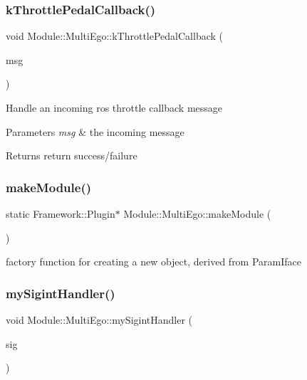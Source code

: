 \subsubsection{\texorpdfstring{k\+Throttle\+Pedal\+Callback()}{kThrottlePedalCallback()}}
{\footnotesize\ttfamily void Module\+::\+Multi\+Ego\+::k\+Throttle\+Pedal\+Callback (\begin{DoxyParamCaption}\item[{const std\+\_\+msgs\+::\+Float32\+::\+Const\+Ptr \&}]{msg }\end{DoxyParamCaption})}

Handle an incoming ros throttle callback message 
\begin{DoxyParams}{Parameters}
{\em msg} & the incoming message \\
\hline
\end{DoxyParams}
\begin{DoxyReturn}{Returns}
return success/failure 
\end{DoxyReturn}
\mbox{\label{classModule_1_1MultiEgo_afc9e4ee3cf0605085377e1387a2ef16c}} 
\subsubsection{\texorpdfstring{make\+Module()}{makeModule()}}
{\footnotesize\ttfamily static Framework\+::\+Plugin$\ast$ Module\+::\+Multi\+Ego\+::make\+Module (\begin{DoxyParamCaption}{ }\end{DoxyParamCaption})\hspace{0.3cm}{\ttfamily [static]}}

factory function for creating a new object, derived from Param\+Iface \mbox{\label{classModule_1_1MultiEgo_a7a8c8f84f0b814d2340789b119a8598f}} 
\subsubsection{\texorpdfstring{my\+Sigint\+Handler()}{mySigintHandler()}}
{\footnotesize\ttfamily void Module\+::\+Multi\+Ego\+::my\+Sigint\+Handler (\begin{DoxyParamCaption}\item[{int}]{sig }\end{DoxyParamCaption})\hspace{0.3cm}{\ttfamily [static]}}


